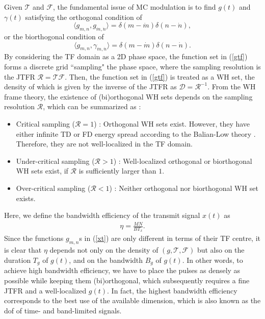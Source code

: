 \documentclass[journal]{IEEEtran}
\begin{document}
Given $\mathcal T$ and $\mathcal F$, the fundamental issue of MC modulation is to find $g(t)$ and $\gamma(t)$ satisfying the orthogonal condition of
\begin{equation}\label{g_ortho}
  \langle g_{m,n}, g_{\dot m,\dot n}\rangle =\delta(m-\dot m)\delta(n-\dot n),
\end{equation}
or the biorthogonal condition of
\begin{equation}\label{g_biortho}
  \langle g_{m,n}, \gamma_{\dot m,\dot n}\rangle =\delta(m-\dot m)\delta(n-\dot n).
\end{equation}
By considering the TF domain as a 2D phase space, the function set in (\ref{gtf}) forms a discrete grid ``sampling" the phase space\cite{haas_wpc_97,wavelet}, where the sampling resolution is the JTFR $\mathcal R=\mathcal T\mathcal F$.
Then, the function set in (\ref{gtf}) is treated as a WH set, the density of which is given by
the inverse of the JTFR as $\mathcal D=\mathcal R^{-1}$.
From the WH frame theory, the existence of (bi)orthogonal WH sets depends on the sampling resolution $\mathcal R$, which can be summarized as \cite{cofdm,wavelet,ftfa,gaborana,wexler1990,haas_wpc_97,kozek98,tff,strohmer2003}:
\begin{itemize}
  \item Critical sampling ($\mathcal R =1$) : Orthogonal WH sets exist.  However, they have either infinite TD or FD energy spread according to the Balian-Low theory \cite{wavelet_book}. Therefore, they are not well-localized in the TF domain.
  \item Under-critical sampling ($\mathcal R >1$) : Well-localized orthogonal or biorthogonal WH sets exist, if $\mathcal R$ is sufficiently larger than $1$.
  \item Over-critical sampling ($\mathcal R <1$) : Neither orthogonal nor biorthogonal WH set exists.
\end{itemize}

Here, we define the bandwidth efficiency of the transmit signal $x(t)$ as
\begin{align} \label{se}
  \eta=\frac{MN}{BT_x}.
\end{align}
Since the functions $g_{m,n}$s in (\ref{xt}) are only different in terms of their TF centre, 
it is clear that $\eta$ depends not only on the density of $\left(g,\mathcal T, \mathcal F\right)$ but also on the duration $T_g$ of $g(t)$, and on the bandwidth $B_g$ of $g(t)$.
In other words, to achieve high bandwidth efficiency, we have to place the pulses 
as densely as possible while keeping them (bi)orthogonal, which subsequently requires a fine JTFR and a well-localized $g(t)$. In fact, the highest bandwidth efficiency corresponds to the best use of the available dimension, which is also known as the \ac{dof} of time- and band-limited signals\cite{Jacobs_pce,fwc,onbandwidth}.
\end{document}
